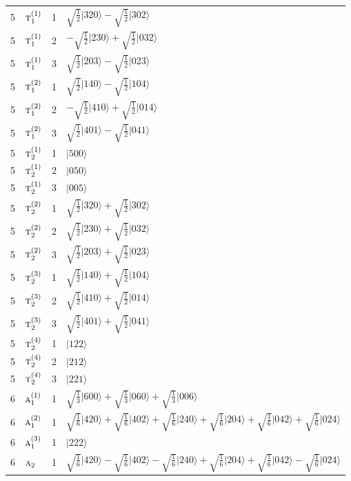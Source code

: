 \documentclass[11pt]{article}
\newcommand{\irr}[1]{\text{\normalfont\scshape #1}}
\newcommand{\occ}[1]{\lvert #1\rangle}
\begin{document}
\begin{longtable}{c l c p{}}
5 & $\irr{t}_{1}^{(1)}$ & 1 & $\sqrt{\tfrac{1}{2}}\occ{320}-\sqrt{\tfrac{1}{2}}\occ{302}$\\
5 & $\irr{t}_{1}^{(1)}$ & 2 & $-\sqrt{\tfrac{1}{2}}\occ{230}+\sqrt{\tfrac{1}{2}}\occ{032}$\\
5 & $\irr{t}_{1}^{(1)}$ & 3 & $\sqrt{\tfrac{1}{2}}\occ{203}-\sqrt{\tfrac{1}{2}}\occ{023}$\\
5 & $\irr{t}_{1}^{(2)}$ & 1 & $\sqrt{\tfrac{1}{2}}\occ{140}-\sqrt{\tfrac{1}{2}}\occ{104}$\\
5 & $\irr{t}_{1}^{(2)}$ & 2 & $-\sqrt{\tfrac{1}{2}}\occ{410}+\sqrt{\tfrac{1}{2}}\occ{014}$\\
5 & $\irr{t}_{1}^{(2)}$ & 3 & $\sqrt{\tfrac{1}{2}}\occ{401}-\sqrt{\tfrac{1}{2}}\occ{041}$\\
5 & $\irr{t}_{2}^{(1)}$ & 1 & $\occ{500}$\\
5 & $\irr{t}_{2}^{(1)}$ & 2 & $\occ{050}$\\
5 & $\irr{t}_{2}^{(1)}$ & 3 & $\occ{005}$\\
5 & $\irr{t}_{2}^{(2)}$ & 1 & $\sqrt{\tfrac{1}{2}}\occ{320}+\sqrt{\tfrac{1}{2}}\occ{302}$\\
5 & $\irr{t}_{2}^{(2)}$ & 2 & $\sqrt{\tfrac{1}{2}}\occ{230}+\sqrt{\tfrac{1}{2}}\occ{032}$\\
5 & $\irr{t}_{2}^{(2)}$ & 3 & $\sqrt{\tfrac{1}{2}}\occ{203}+\sqrt{\tfrac{1}{2}}\occ{023}$\\
5 & $\irr{t}_{2}^{(3)}$ & 1 & $\sqrt{\tfrac{1}{2}}\occ{140}+\sqrt{\tfrac{1}{2}}\occ{104}$\\
5 & $\irr{t}_{2}^{(3)}$ & 2 & $\sqrt{\tfrac{1}{2}}\occ{410}+\sqrt{\tfrac{1}{2}}\occ{014}$\\
5 & $\irr{t}_{2}^{(3)}$ & 3 & $\sqrt{\tfrac{1}{2}}\occ{401}+\sqrt{\tfrac{1}{2}}\occ{041}$\\
5 & $\irr{t}_{2}^{(4)}$ & 1 & $\occ{122}$\\
5 & $\irr{t}_{2}^{(4)}$ & 2 & $\occ{212}$\\
5 & $\irr{t}_{2}^{(4)}$ & 3 & $\occ{221}$\\
\hline
6 & $\irr{a}_{1}^{(1)}$ & 1 & $\sqrt{\tfrac{1}{3}}\occ{600}+\sqrt{\tfrac{1}{3}}\occ{060}+\sqrt{\tfrac{1}{3}}\occ{006}$\\
6 & $\irr{a}_{1}^{(2)}$ & 1 & $\sqrt{\tfrac{1}{6}}\occ{420}+\sqrt{\tfrac{1}{6}}\occ{402}+\sqrt{\tfrac{1}{6}}\occ{240}+\sqrt{\tfrac{1}{6}}\occ{204}+\sqrt{\tfrac{1}{6}}\occ{042}+\sqrt{\tfrac{1}{6}}\occ{024}$\\
6 & $\irr{a}_{1}^{(3)}$ & 1 & $\occ{222}$\\
6 & $\irr{a}_{2}$ & 1 & $\sqrt{\tfrac{1}{6}}\occ{420}-\sqrt{\tfrac{1}{6}}\occ{402}-\sqrt{\tfrac{1}{6}}\occ{240}+\sqrt{\tfrac{1}{6}}\occ{204}+\sqrt{\tfrac{1}{6}}\occ{042}-\sqrt{\tfrac{1}{6}}\occ{024}$\\

\end{longtable}
\end{document}

